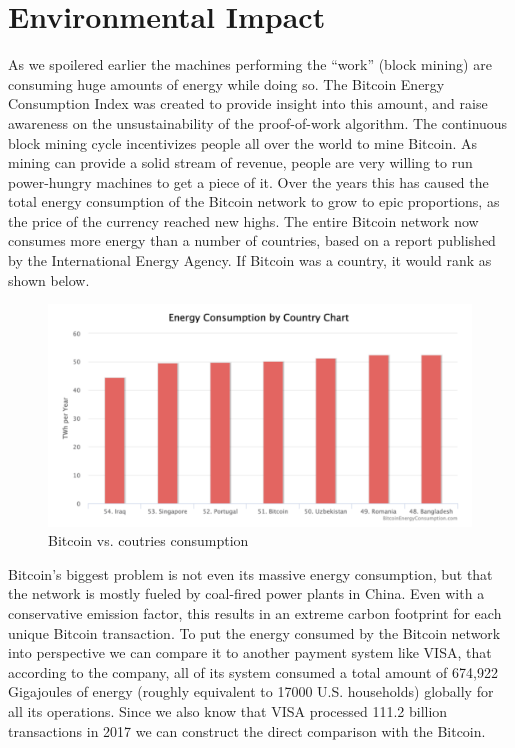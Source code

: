 \documentclass{article}
\begin{document}
\clearpage

\section*{Environmental Impact}
As we spoilered earlier the machines performing the “work” (block mining) are consuming huge amounts of energy while doing so. The Bitcoin Energy Consumption Index was created to provide insight into this amount, and raise awareness on the unsustainability of the proof-of-work algorithm.\newline
The continuous block mining cycle incentivizes people all over the world to mine Bitcoin. As mining can provide a solid stream of revenue, people are very willing to run power-hungry machines to get a piece of it. Over the years this has caused the total energy consumption of the Bitcoin network to grow to epic proportions, as the price of the currency reached new highs. The entire Bitcoin network now consumes more energy than a number of countries, based on a report published by the International Energy Agency. If Bitcoin was a country, it would rank as shown below.

\begin{figure}[H]
    \centering
    \includegraphics[width=12cm]{images/15.png}
    \caption{Bitcoin vs. coutries consumption}
\end{figure}

\noindent Bitcoin’s biggest problem is not even its massive energy consumption, but that the network is mostly fueled by coal-fired power plants in China. Even with a conservative emission factor, this results in an extreme carbon footprint for each unique Bitcoin transaction.\newline
To put the energy consumed by the Bitcoin network into perspective we can compare it to another payment system like VISA, that according to the company, all of its system consumed a total amount of 674,922 Gigajoules of energy (roughly equivalent to 17000 U.S. households) globally for all its operations. Since we also know that VISA processed 111.2 billion transactions in 2017 we can construct the direct comparison with the Bitcoin.
\end{document}
